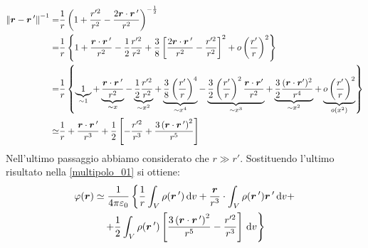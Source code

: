 \begin{align*}
  {\left\lVert\boldsymbol{r}-\boldsymbol{r}\,'\right\rVert}^{-1}= & \frac{1}{r}\left(1+\frac{r'^2}{r^2}-\frac{2\boldsymbol{r}\cdot \boldsymbol{r}\,'}{r^2}\right)^{-\frac{1}{2}}                                                                                                                                                                                                                                                                                                                                             \\
  =                             & \frac{1}{r}\left\{1+\frac{\boldsymbol{r}\cdot\boldsymbol{r}\,'}{r^2}-\frac{1}{2}\frac{r'^2}{r^2}+\frac{3}{8}\left[\frac{2\boldsymbol{r}\cdot\boldsymbol{r}\,'}{r^2}-\frac{r'^2}{r^2}\right]^2+o\left(\frac{r'}{r}\right)^2\right\}                                                                                                                                                                                                                                         \\
  =                             & \frac{1}{r}\left\{\underbrace{1}_{\sim 1}+\underbrace{\frac{\boldsymbol{r}\cdot\boldsymbol{r}\,'}{r^2}}_{\sim x}-\underbrace{\frac{1}{2}\frac{r'^2}{r^2}}_{\sim x^2}+\underbrace{\frac{3}{8}\left(\frac{r'}{r}\right)^4}_{\sim x^4}-\underbrace{\frac{3}{2}\left(\frac{r'}{r}\right)^2\frac{\boldsymbol{r}\cdot \boldsymbol{r}'}{r^2}}_{\sim x^3}+\underbrace{\frac{3}{2}\frac{(\boldsymbol{r}\cdot \boldsymbol{r}')^2}{r^4}}_{\sim x^2}+\underbrace{o\left(\frac{r'}{r}\right)^2}_{o(x^2)}\right\} \\
  \simeq                        & \frac{1}{r}+\frac{\boldsymbol{r}\cdot\boldsymbol{r}\,'}{r^3}+\frac{1}{2}\left[-\frac{r'^2}{r^3}+\frac{3\left(\boldsymbol{r}\cdot\boldsymbol{r}\,'\right)^2}{r^5}\right]                                                                                                                                                                                                                                                                                                    \\
\end{align*}
Nell'ultimo passaggio abbiamo considerato che $r\gg r'$. Sostituendo l'ultimo risultato nella \eqref{multipolo_01} si ottiene:
\begin{multline}
  \label{multipolo02}
  \varphi(\boldsymbol{r})\simeq\frac{1}{4\pi\varepsilon_0}\left\{\frac{1}{r}\int_V\rho(\boldsymbol{r}\,')\,\mathrm{d} v+\frac{\boldsymbol{r}}{r^3}\cdot\int_V\rho(\boldsymbol{r}\,')\boldsymbol{r}\,'\,\mathrm{d} v+\right.\\
  \left.+\frac{1}{2}\int_V\rho(\boldsymbol{r}\,')\left[\frac{3\left(\boldsymbol{r}\cdot\boldsymbol{r}\,'\right)^2}{r^5}-\frac{r'^2}{r^3}\right]\,\mathrm{d} v\right\}
\end{multline}
